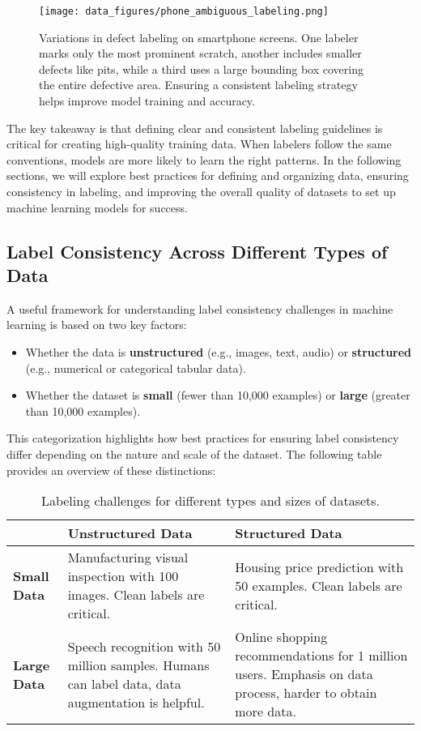 \documentclass[12pt,openany]{book}
\begin{document}
\begin{figure}[H]
    \centering
    \texttt{[image: data\_figures/phone\_ambiguous\_labeling.png]}
    \caption{Variations in defect labeling on smartphone screens. One labeler marks only the most prominent scratch, another includes smaller defects like pits, while a third uses a large bounding box covering the entire defective area. Ensuring a consistent labeling strategy helps improve model training and accuracy.}
    \label{fig:phone_ambiguous_labeling}
\end{figure}

The key takeaway is that defining clear and consistent labeling guidelines is critical for creating high-quality training data. When labelers follow the same conventions, models are more likely to learn the right patterns. In the following sections, we will explore best practices for defining and organizing data, ensuring consistency in labeling, and improving the overall quality of datasets to set up machine learning models for success.

\subsection{Label Consistency Across Different Types of Data}

A useful framework for understanding label consistency challenges in machine learning is based on two key factors:
\begin{itemize}
    \item Whether the data is \textbf{unstructured} (e.g., images, text, audio) or \textbf{structured} (e.g., numerical or categorical tabular data).
    \item Whether the dataset is \textbf{small} (fewer than 10,000 examples) or \textbf{large} (greater than 10,000 examples).
\end{itemize}

This categorization highlights how best practices for ensuring label consistency differ depending on the nature and scale of the dataset. The following table provides an overview of these distinctions:

\begin{table}[H]
    \centering
    \renewcommand{\arraystretch}{1.5}
    \begin{tabular}{|p{3.5cm}|p{5.5cm}|p{5.5cm}|}
        \hline
        \textbf{} & \textbf{Unstructured Data} & \textbf{Structured Data} \\
        \hline
        \textbf{Small Data} & Manufacturing visual inspection with 100 images. Clean labels are critical.  & Housing price prediction with 50 examples. Clean labels are critical. \\
        \hline
        \textbf{Large Data} & Speech recognition with 50 million samples. Humans can label data, data augmentation is helpful. & Online shopping recommendations for 1 million users. Emphasis on data process, harder to obtain more data. \\
        \hline
    \end{tabular}
    \caption{Labeling challenges for different types and sizes of datasets.}
    \label{tab:label_consistency_framework}
\end{table}
\end{document}
